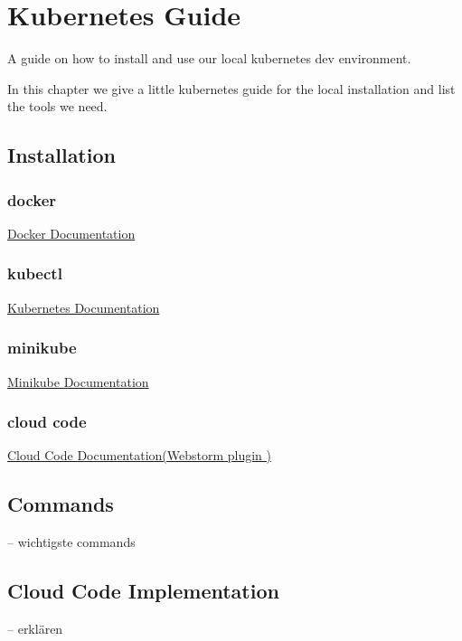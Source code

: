\chapter{Kubernetes Guide}
A guide on how to install and use our local kubernetes dev environment.

In this chapter we give a little kubernetes guide for the local installation and list the tools we need.
\section{Installation}
\subsection{docker}
\href{https://docs.docker.com/get-docker/}{Docker Documentation}

\subsection{kubectl}
\href{https://kubernetes.io/docs/tasks/tools/#kubectl}{Kubernetes Documentation}

\subsection{minikube}
\href{https://minikube.sigs.k8s.io/docs/start/}{Minikube Documentation}

\subsection{cloud code}
\href{https://plugins.jetbrains.com/plugin/8079-cloud-code/}{Cloud Code Documentation(Webstorm plugin
)}

\section{Commands}
-- wichtigste commands

\section{Cloud Code Implementation}
-- erklären